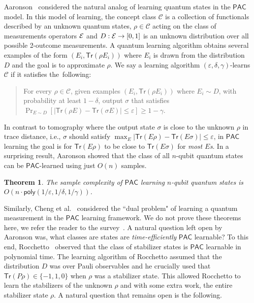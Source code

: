 \documentclass[11pt]{article}
\newcommand{\Cc}{\ensuremath{\mathcal{C}}}
\newcommand{\A}{\ensuremath{\mathcal{A}}}
\newcommand{\PAC}{\ensuremath{\mathsf{PAC}}}
\newcommand{\Tr}{\textsf{Tr}}
\newcommand{\calE}{{\cal E }}
\newtheorem{theorem}{Theorem}
\begin{document}
Aaronson~\cite{aaronson2007learnability} considered the natural analog of learning quantum states in the $\PAC$ model. In this model of learning, the  concept class $\Cc$ is a collection of functionals described by an unknown quantum states, $\rho \in \Cc$ acting on the class of measurements operators $\calE$ and $D:\calE\rightarrow [0,1]$ is an unknown distribution over all possible 2-outcome measurements.   A quantum learning algorithm obtains several examples of the form $(E_i,\Tr(\rho E_i))$ where $E_i$ is drawn from the distribution $D$ and the goal is to approximate $\rho$. We say a learning algorithm $(\varepsilon,\delta,\gamma)$-learns $\Cc$ if it satisfies the~following: 
\begin{quote}
    For every $\rho\in \Cc$, given examples $(E_i,\Tr(\rho E_i))$ where $E_i\sim D$, with probability at least $1-\delta$, output $\sigma$ that satisfies $\Pr_{E\sim D}[|\Tr(\rho E)-\Tr(\sigma E)|\leq \varepsilon]\geq 1-\gamma$.
\end{quote}
In contrast to tomography where the output state $\sigma$ is close to the unknown $\rho$ in trace distance, i.e., $\sigma$ should satisfy $\max_{E}|\Tr(E\rho)-\Tr(E\sigma)|\leq \varepsilon$, in $\PAC$ learning the goal is for $\Tr(E\rho)$ to be close to $\Tr(E\sigma)$ for \emph{most $E$s}. In a surprising result, Aaronson showed that the class of all $n$-qubit quantum states can be $\PAC$-learned using just  $O(n)$ samples.
\begin{theorem}
The sample complexity of $\PAC$ learning $n$-qubit quantum states is $O(n\cdot \textsf{poly}(1/\varepsilon,1/\delta,1/\gamma))$. 
\end{theorem}
Similarly, Cheng et al.~\cite{cheng2015learnability} considered the ``dual problem" of learning a quantum measurement in the $\PAC$ learning framework. We do not prove these theorems here, we refer the reader to the survey~\cite[Theorem~4.16]{DBLP:journals/sigact/ArunachalamW17}.  A natural question left open by Aaronson was, what classes are states are \emph{time-efficiently} $\PAC$ learnable? To this end, Rocchetto~\cite{rocchetto2017stabiliser} observed that the class of stabilizer states is $\PAC$ learnable in polynomial time. The learning algorithm of Rocchetto assumed that the distribution $D$  was over Pauli observables and he crucially used that $\Tr(P \rho)\in \{-1,1,0\}$ when $\rho$ was a stabilizer state. This allowed Rocchetto to learn the stabilizers of the unknown $\rho$ and with some extra work, the entire stabilizer state $\rho$.  A natural question that remains open is the following.
\end{document}

